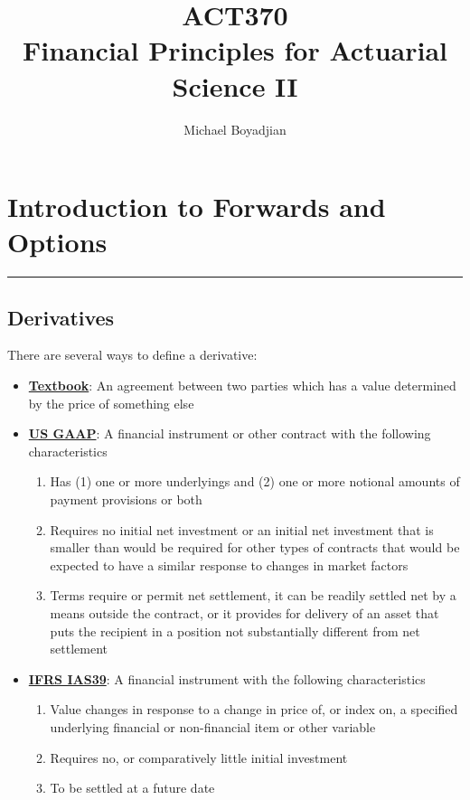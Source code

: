 \documentclass[11pt]{article}
\begin{document}
\title{ACT370  \\ Financial Principles for Actuarial Science II}
\author{Michael Boyadjian}
\maketitle
\pagebreak

\tableofcontents

\pagebreak

\bigskip
\bigskip
\bigskip


\section{Introduction to Forwards and Options}
\hrule \vspace{15pt}
\subsection{Derivatives}
There are several ways to define a derivative:
\begin{itemize}
\item \underline{\textbf{Textbook}}: An agreement between two parties which has a value determined by the price of something else
\item \underline{\textbf{US GAAP}}: A financial instrument or other contract with the following characteristics 
\begin{enumerate}
\item Has (1) one or more underlyings and (2) one or more notional amounts of payment provisions or both
\item Requires no initial net investment or an initial net investment that is smaller than would be required for other types of contracts that would be expected to have a similar response to changes in market factors
\item Terms require or permit net settlement, it can be readily settled net by a means outside the contract, or it provides for delivery of an asset that puts the recipient in a position not substantially different from net settlement
\end{enumerate}
\item \underline{\textbf{IFRS IAS39}}:  A financial instrument with the following characteristics 
\begin{enumerate}
\item Value changes in response to a change in price of, or index on,  a specified underlying financial or non-financial item or other variable
\item Requires no, or comparatively little initial investment
\item To be settled at a future date
\end{enumerate}
\end{itemize}
\end{document}
